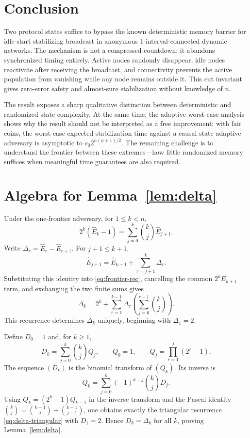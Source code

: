 \documentclass[11pt]{article}
\begin{document}
\section{Conclusion}

Two protocol states suffice to bypass the known deterministic memory barrier for idle-start stabilizing broadcast in anonymous 1-interval-connected dynamic networks. The mechanism is not a compressed countdown: it abandons synchronized timing entirely. Active nodes randomly disappear, idle nodes reactivate after receiving the broadcast, and connectivity prevents the active population from vanishing while any node remains outside it. This cut invariant gives zero-error safety and almost-sure stabilization without knowledge of $n$.

The result exposes a sharp qualitative distinction between deterministic and randomized state complexity. At the same time, the adaptive worst-case analysis shows why the result should not be interpreted as a free improvement: with fair coins, the worst-case expected stabilization time against a causal state-adaptive adversary is asymptotic to $c_0 2^{n(n+1)/2}$. The remaining challenge is to understand the frontier between these extremes---how little randomized memory suffices when meaningful time guarantees are also required.

\appendix
\section{Algebra for Lemma~\ref{lem:delta}}\label{app:delta}

Under the one-frontier adversary, for $1\le k<n$,
\begin{equation}\label{eq:frontier-rec}
  2^k(\widehat E_k-1)
  =\sum_{j=0}^{k}\binom{k}{j}\widehat E_{j+1}.
\end{equation}
Write $\Delta_r=\widehat E_r-\widehat E_{r+1}$. For $j+1\le k+1$,
\[
  \widehat E_{j+1}
  =\widehat E_{k+1}+\sum_{r=j+1}^{k}\Delta_r.
\]
Substituting this identity into \eqref{eq:frontier-rec}, cancelling the common $2^k\widehat E_{k+1}$ term, and exchanging the two finite sums gives
\begin{equation}\label{eq:delta-triangular}
  \Delta_k
  =2^k+
   \sum_{r=1}^{k-1}\Delta_r
   \left(\sum_{j=0}^{r-1}\binom{k}{j}\right).
\end{equation}
This recurrence determines $\Delta_k$ uniquely, beginning with $\Delta_1=2$.

Define $D_0=1$ and, for $k\ge1$,
\[
  D_k=\sum_{j=0}^{k}\binom{k}{j}Q_j,
  \qquad
  Q_0=1,
  \qquad
  Q_j=\prod_{r=1}^{j}(2^r-1).
\]
The sequence $(D_k)$ is the binomial transform of $(Q_k)$. Its inverse is
\[
  Q_k=\sum_{j=0}^{k}(-1)^{k-j}\binom{k}{j}D_j.
\]
Using $Q_k=(2^k-1)Q_{k-1}$ in the inverse transform and the Pascal identity $\binom{k}{j}=\binom{k-1}{j}+\binom{k-1}{j-1}$, one obtains exactly the triangular recurrence \eqref{eq:delta-triangular} with $D_1=2$. Hence $D_k=\Delta_k$ for all $k$, proving Lemma~\ref{lem:delta}.
\end{document}
